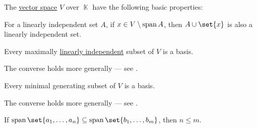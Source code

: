 \begin{proposition}\label{thm:def:vector_space}
  The \hyperref[def:vector_space]{vector space} \( V \) over \( \BbbK \) have the following basic properties:
  \begin{thmenum}
     For a linearly independent set \( A \), if \( x \in V \setminus \operatorname{span} A \), then \( A \cup \set{ x } \) is also a linearly independent set.

     Every maximally \hyperref[thm:def:linear_dependence]{linearly independent} subset of \( V \) is a basis.

    The converse holds more generally --- see .

     Every minimal generating subset of \( V \) is a basis.

    The converse holds more generally --- see .

     If \( \linspan\set{ a_1, \ldots, a_n } \subseteq \linspan\set{ b_1, \ldots, b_m } \), then \( n \leq m \).
  \end{thmenum}
\end{proposition}

